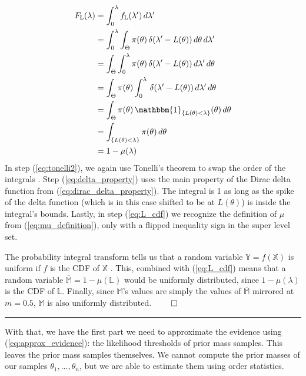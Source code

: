 \documentclass[12pt, a4paper]{report}
\begin{document}
\begin{align}
    F_\mathbb{L}(\lambda) &= \int_0^\lambda f_\mathbb{L}(\lambda') \, d\lambda' \nonumber\\
    &= \int_0^\lambda \int_\Theta \pi(\theta) \, \delta(\lambda' - L(\theta)) \, d\theta \, d\lambda' \nonumber\\
    &= \int_\Theta \int_0^\lambda \pi(\theta) \, \delta(\lambda' - L(\theta)) \, d\lambda'\, d\theta \label{eq:tonelli2}\\
    &= \int_\Theta \pi(\theta) \int_0^\lambda \, \delta(\lambda' - L(\theta)) \, d\lambda' \, d\theta \nonumber\\
    &= \int_\Theta \pi(\theta) \, \mathbbm{1}_{\{L(\theta) < \lambda\}}(\theta) \, d\theta \label{eq:delta_property}\\
    &= \int_{\{L(\theta) < \lambda\}} \pi(\theta) \, d\theta \nonumber\\
    &= 1 - \mu(\lambda) \label{eq:L_cdf}
\end{align}
In step (\ref{eq:tonelli2}), we again use Tonelli's theorem to swap the order of the integrals \cite[147]{measure_theory}.
Step (\ref{eq:delta_property}) uses the main property of the Dirac delta function from (\ref{eq:dirac_delta_property}).
The integral is 1 as long as the spike of the delta function (which is in this case shifted to be at $L(\theta)$) is inside the integral's bounds.
Lastly, in step (\ref{eq:L_cdf}) we recognize the definition of $\mu$ from (\ref{eq:mu_definition}), only with a flipped inequality sign in the super level set.

The probability integral transform tells us that a random variable $\mathbb{Y} = f(\mathbb{X})$ is uniform if $f$ is the CDF of $\mathbb{X}$ \cite[54]{casellaberger}.
This, combined with (\ref{eq:L_cdf}) means that a random variable $\overline{\mathbb{M}} = 1 - \mu(\mathbb{L})$ would be uniformly distributed, since $1 - \mu(\lambda)$ is the CDF of $\mathbb{L}$.
Finally, since $\mathbb{M}$'s values are simply the values of $\overline{\mathbb{M}}$ mirrored at $m = 0.5$, $\mathbb{M}$ is also uniformly distributed.
\hfill $\qed$
\vspace{0.2cm} \hrule \vspace{0.2cm}

With that, we have the first part we need to approximate the evidence using (\ref{eq:approx_evidence}): the likelihood thresholds of prior mass samples.
This leaves the prior mass samples themselves.
We cannot compute the prior masses of our samples $\theta_1, ... ,\theta_n$, but we are able to estimate them using order statistics.
\end{document}
